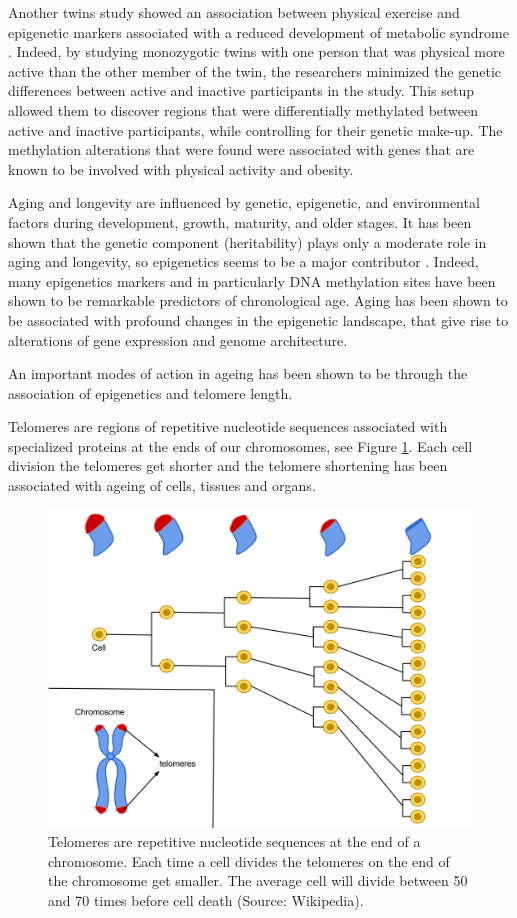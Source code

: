 \documentclass[
  11pt,
]{book}
\begin{document}
Another twins study showed an association between physical exercise and epigenetic markers associated with a reduced development of metabolic syndrome \citep{Duncan2022}. Indeed, by studying monozygotic twins with one person that was physical more active than the other member of the twin, the researchers minimized the genetic differences between active and inactive participants in the study. This setup allowed them to discover regions that were differentially methylated between active and inactive participants, while controlling for their genetic make-up. The methylation alterations that were found were associated with genes that are known to be involved with physical activity and obesity.

Aging and longevity are influenced by genetic, epigenetic, and environmental factors during development, growth, maturity, and older stages.
It has been shown that the genetic component (heritability) plays only a moderate role in aging and longevity, so epigenetics seems to be a major contributor \citep{Adwan2018}. Indeed, many epigenetics markers and in particularly DNA methylation sites have been shown to be remarkable predictors of chronological age.
Aging has been shown to be associated
with profound changes in the epigenetic landscape, that give rise to alterations of gene expression and genome architecture.

An important modes of action in ageing has been shown to be through the association of epigenetics and telomere length.

Telomeres are regions of repetitive nucleotide sequences associated with specialized proteins at the ends of our chromosomes, see Figure \ref{fig:telomeres}. Each cell division the telomeres get shorter and the telomere shortening has been associated with ageing of cells, tissues and organs.

\begin{figure}

{\centering \includegraphics[width=0.8\linewidth]{./figs/telomeres} 

}

\caption{Telomeres are repetitive nucleotide sequences at the end of a chromosome. Each time a cell divides the telomeres on the end of the chromosome get smaller. The average cell will divide between 50 and 70 times before cell death (Source: Wikipedia).}\label{fig:telomeres}
\end{figure}
\end{document}
